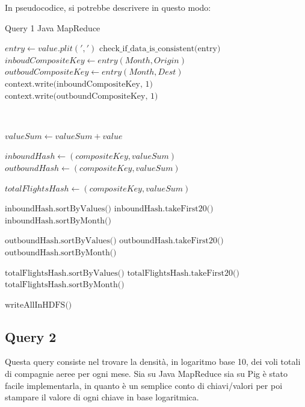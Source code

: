 \documentclass[11pt]{article} %
\begin{document}
In pseudocodice, si potrebbe descrivere in questo modo:

\newpage 

\begin{algorithm}
\caption{Query 1 Java MapReduce}\label{euclid}
\begin{algorithmic}[0]


\State $entry \gets value.plit(',')$
\State $\text{check\_if\_data\_is\_consistent(entry)}$
\State $inboudCompositeKey \gets entry(Month, Origin)$
\State $outboudCompositeKey \gets entry(Month, Dest)$
\State $\text{context.write(inboundCompositeKey, 1)}$
\State $\text{context.write(outboundCompositeKey, 1)}$

\EndProcedure

~


	\State $valueSum \gets valueSum + value$
\EndFor

	\State $inboundHash \gets (compositeKey, valueSum)$
\Else
	\State $outboundHash \gets (compositeKey, valueSum)$
\EndIf

\State $totalFlightsHash \gets (compositeKey, valueSum)$

\EndProcedure 


\State $\text{inboundHash.sortByValues()}$
\State $\text{inboundHash.takeFirst20()}$
\State $\text{inboundHash.sortByMonth()}$

\State $\text{outboundHash.sortByValues()}$
\State $\text{outboundHash.takeFirst20()}$
\State $\text{outboundHash.sortByMonth()}$

\State $\text{totalFlightsHash.sortByValues()}$
\State $\text{totalFlightsHash.takeFirst20()}$
\State $\text{totalFlightsHash.sortByMonth()}$

\State $\text{writeAllInHDFS()}$

\EndProcedure


\end{algorithmic}
\end{algorithm}

\subsection{Query 2}

Questa query consiste nel trovare la densità, in logaritmo base 10, dei voli totali di compagnie aeree per ogni mese. Sia su Java MapReduce sia su Pig è stato facile implementarla, in quanto è un semplice conto di chiavi/valori per poi stampare il valore di ogni chiave in base logaritmica.
\end{document}
